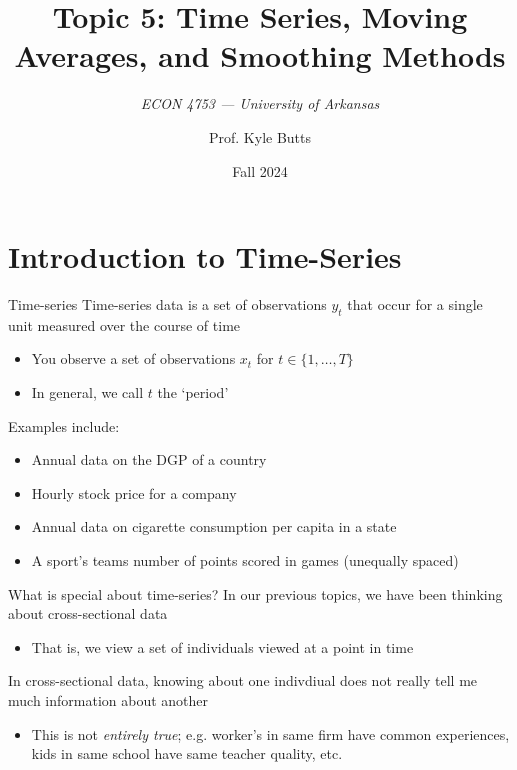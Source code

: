 \documentclass[aspectratio=169,t,11pt,table]{beamer}
\title{Topic 5: Time Series, Moving Averages, and Smoothing Methods}
\subtitle{\it  ECON 4753 — University of Arkansas}
\date{Fall 2024}
\author{Prof. Kyle Butts}
\begin{document}
\begin{frame}
\maketitle

\end{frame}

\section{Introduction to Time-Series}

\begin{frame}{Time-series}
  \alert{Time-series} data is a set of observations $y_t$ that occur for a single unit measured over the course of time
  \begin{itemize}
    \item You observe a set of observations $x_t$ for $t \in \{ 1, \dots, T \}$
    \item In general, we call $t$ the `period'
  \end{itemize}

  \pause
  \bigskip
  Examples include:
  \begin{itemize}
    \item Annual data on the DGP of a country
    \item Hourly stock price for a company
    \item Annual data on cigarette consumption per capita in a state 
    \item A sport's teams number of points scored in games (unequally spaced)
  \end{itemize}
\end{frame}


\begin{frame}{What is special about time-series?}
  In our previous topics, we have been thinking about \alert{cross-sectional} data
  \begin{itemize}
    \item That is, we view a set of individuals viewed at a point in time
  \end{itemize}

  \bigskip
  In cross-sectional data, knowing about one indivdiual does not really tell me much information about another
  \begin{itemize}
    \item This is not \emph{entirely true}; e.g. worker's in same firm have common experiences, kids in same school have same teacher quality, etc.
  \end{itemize}
\end{frame}
\end{document}
